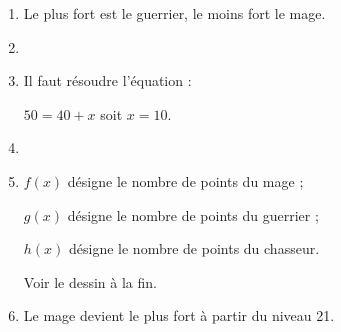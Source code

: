 
\bigskip
 
%
% 
%
%
%

\begin{enumerate}
\item %
Le plus fort est le guerrier, le moins fort le mage.
\item %
\item %
Il faut résoudre l'équation :

$50 = 40 + x$  soit $x = 10$.
\item %

% 
 
\item %
$f(x)$ désigne le nombre de points du mage ;

$g(x)$ désigne le nombre de points du guerrier ;

$h(x)$ désigne le nombre de points du chasseur.

Voir le dessin à la fin. 
\item %
Le mage devient le plus fort à partir du niveau 21. 
\end{enumerate} 


